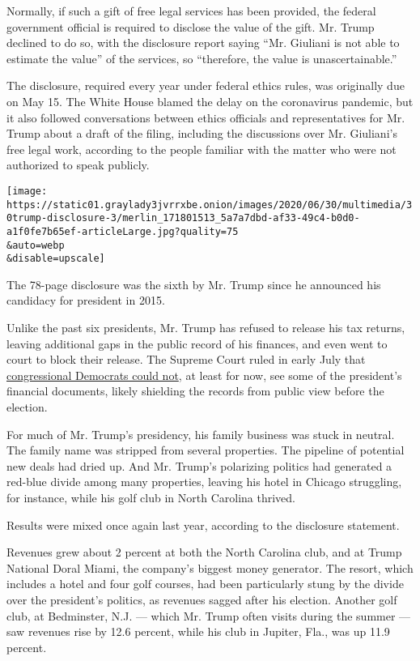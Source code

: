 Normally, if such a gift of free legal services has been provided, the
federal government official is required to disclose the value of the
gift. Mr. Trump declined to do so, with the disclosure report saying
``Mr. Giuliani is not able to estimate the value'' of the services, so
``therefore, the value is unascertainable.''

The disclosure, required every year under federal ethics rules, was
originally due on May 15. The White House blamed the delay on the
coronavirus pandemic, but it also followed conversations between ethics
officials and representatives for Mr. Trump about a draft of the filing,
including the discussions over Mr. Giuliani's free legal work, according
to the people familiar with the matter who were not authorized to speak
publicly.

\texttt{[image: https://static01.graylady3jvrrxbe.onion/images/2020/06/30/multimedia/30trump-disclosure-3/merlin\_171801513\_5a7a7dbd-af33-49c4-b0d0-a1f0fe7b65ef-articleLarge.jpg?quality=75\\\&auto=webp\\\&disable=upscale]}

The 78-page disclosure was the sixth by Mr. Trump since he announced his
candidacy for president in 2015.

Unlike the past six presidents, Mr. Trump has refused to release his tax
returns, leaving additional gaps in the public record of his finances,
and even went to court to block their release. The Supreme Court ruled
in early July that
\href{https://www.supremecourt.gov/opinions/19pdf/19-715_febh.pdf}{congressional
Democrats could not}, at least for now, see some of the president's
financial documents, likely shielding the records from public view
before the election.

For much of Mr. Trump's presidency, his family business was stuck in
neutral. The family name was stripped from several properties. The
pipeline of potential new deals had dried up. And Mr. Trump's polarizing
politics had generated a red-blue divide among many properties, leaving
his hotel in Chicago struggling, for instance, while his golf club in
North Carolina thrived.

Results were mixed once again last year, according to the disclosure
statement.

Revenues grew about 2 percent at both the North Carolina club, and at
Trump National Doral Miami, the company's biggest money generator. The
resort, which includes a hotel and four golf courses, had been
particularly stung by the divide over the president's politics, as
revenues sagged after his election. Another golf club, at Bedminster,
N.J. --- which Mr. Trump often visits during the summer --- saw revenues
rise by 12.6 percent, while his club in Jupiter, Fla., was up 11.9
percent.

